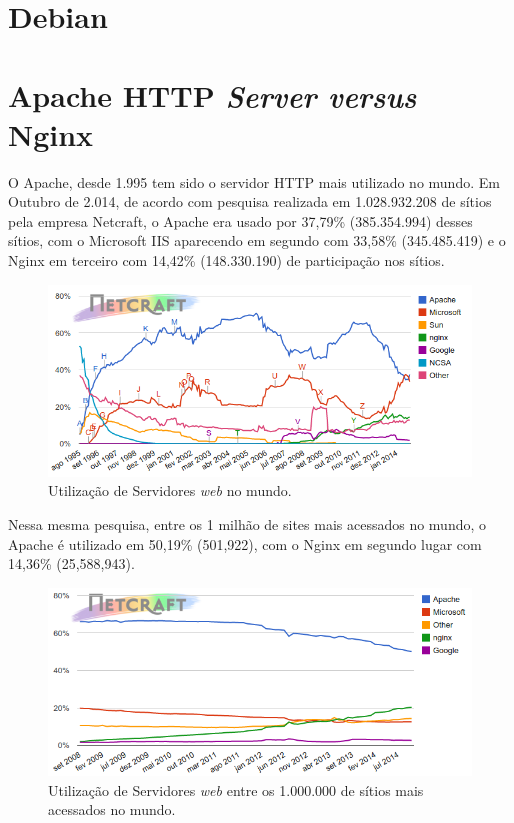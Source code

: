 \section{Debian}

\section{Apache HTTP \textit{Server versus} Nginx}
O Apache, desde 1.995 tem sido o servidor HTTP mais utilizado no mundo. Em Outubro de 2.014, de acordo com pesquisa realizada em 1.028.932.208 de sítios pela empresa Netcraft, o Apache era usado por 37,79\% (385.354.994) desses sítios, com o Microsoft IIS aparecendo em segundo com 33,58\% (345.485.419) e o Nginx em terceiro com 14,42\% (148.330.190) de participação nos sítios.\\

\begin{figure}
\centering
\includegraphics[scale=0.5]{figuras/grafico1}  
\caption{Utilização de Servidores \textit{web} no mundo.}
\label{fig:webservers-utilizacao}
\end{figure}

Nessa mesma pesquisa, entre os 1 milhão de sites mais acessados no mundo, o Apache é utilizado em 50,19\% (501,922), com o Nginx em segundo lugar com 14,36\% (25,588,943).\\

\begin{figure}
\centering
\includegraphics[scale=0.5]{figuras/grafico2} 
\caption{Utilização de Servidores \textit{web} entre os 1.000.000 de sítios mais acessados no mundo.}
\label{fig:webservers-utilizacao-milhao}
\end{figure}

